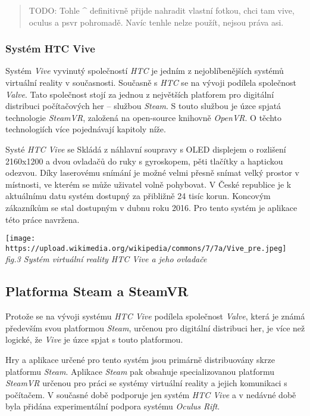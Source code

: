 \begin{quote}
TODO: Tohle \^{} definitivně přijde nahradit vlastní fotkou, chci tam
vive, oculus a psvr pohromadě. Navíc tenhle nelze použít, nejsou práva
asi.
\end{quote}

\subsubsection{Systém HTC Vive}\label{systuxe9m-htc-vive}

Systém \emph{Vive} vyvinutý společností \emph{HTC} je jedním z
nejoblíbenějších systémů virtuální reality v současnosti. Současně s
\emph{HTC} se na vývoji podílela společnost \emph{Valve}. Tato
společnost stojí za jednou z největších platforem pro digitální
distribuci počítačových her -- službou \emph{Steam}. S touto službou je
úzce spjatá technologie \emph{SteamVR}, založená na open-source knihovně
\emph{OpenVR}. O těchto technologiích více pojednávají kapitoly níže.

Systé \emph{HTC Vive} se Skládá z náhlavní soupravy s OLED displejem o
rozlišení 2160x1200 a dvou ovladačů do ruky s gyroskopem, pěti tlačítky
a haptickou odezvou. Díky laserovému snímání je možné velmi přesně
snímat velký prostor v místnosti, ve kterém se může uživatel volně
pohybovat. V České republice je k aktuálnímu datu systém dostupný za
přibližně 24 tisíc korun. Koncovým zákazníkům se stal dostupným v dubnu
roku 2016. Pro tento systém je aplikace této práce navržena.

\texttt{[image: https://upload.wikimedia.org/wikipedia/commons/7/7a/Vive\_pre.jpeg]}\\
\emph{fig.3 Systém virtuální reality HTC Vive a jeho ovladače}

\subsection{Platforma Steam a SteamVR}\label{platforma-steam-a-steamvr}

Protože se na vývoji systému \emph{HTC Vive} podílela společnost
\emph{Valve}, která je známá především svou platformou \emph{Steam},
určenou pro digitální distribuci her, je více než logické, že
\emph{Vive} je úzce spjat s touto platformou.

Hry a aplikace určené pro tento systém jsou primárně distribuovány skrze
platformu \emph{Steam}. Aplikace \emph{Steam} pak obsahuje
specializovanou platformu \emph{SteamVR} určenou pro práci se systémy
virtuální reality a jejich komunikaci s počítačem. V současné době
podporuje jen systém \emph{HTC Vive} a v nedávné době byla přidána
experimentální podpora systému \emph{Oculus Rift}.

